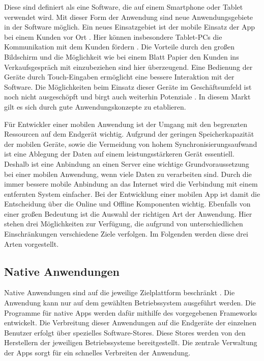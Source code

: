 Diese sind definiert als eine Software, die auf einem Smartphone oder Tablet verwendet wird. Mit dieser Form der Anwendung sind neue Anwendungsgebiete in der Software möglich. Ein neues Einsatzgebiet ist der mobile Einsatz der App bei einem Kunden vor Ort \cite{bib:mobileMarketing}. Hier können insbesondere Tablet-PCs die Kommunikation mit dem Kunden fördern \cite{bib:tableVertrieb}. Die Vorteile durch den großen Bildschirm und die Möglichkeit wie bei einem Blatt Papier den Kunden ins Verkaufsgespräch mit einzubeziehen sind hier überzeugend. Eine Bedienung der Geräte durch Touch-Eingaben ermöglicht eine bessere Interaktion mit der Software. Die Möglichkeiten beim Einsatz dieser Geräte im Geschäftsumfeld ist noch nicht ausgeschöpft und birgt auch weiterhin Potenziale \cite[Fazit]{bib:mobileMarketing2}. In diesem Markt gilt es sich durch gute Anwendungskonzepte zu etablieren. \par

Für Entwickler einer mobilen Anwendung ist der Umgang mit den begrenzten Ressourcen auf dem Endgerät wichtig. 
Aufgrund der geringen Speicherkapazität der mobilen Geräte, sowie die Vermeidung von hohem Synchronisierungsaufwand ist eine Ablegung der Daten auf einem leistungsstärkeren Gerät essentiell. Deshalb ist eine Anbindung an einen Server eine wichtige Grundvoraussetzung bei einer mobilen Anwendung, wenn viele Daten zu verarbeiten sind.  Durch die immer bessere mobile Anbindung an das Internet wird die Verbindung mit einem entfernten System einfacher. Bei der Entwicklung einer mobilen App ist damit die Entscheidung über die Online und Offline Komponenten wichtig.
Ebenfalls von einer großen Bedeutung ist die Auswahl der richtigen Art der Anwendung. Hier stehen drei Möglichkeiten zur Verfügung, die aufgrund von unterschiedlichen Einschränkungen verschiedene Ziele verfolgen. Im Folgenden werden diese drei Arten vorgestellt.

\subsection{Native Anwendungen}
Native Anwendungen sind auf die jeweilige Zielplattform beschränkt \cite{bib:mobilePlattform}. Die Anwendung kann nur auf dem gewählten Betriebssystem ausgeführt werden. Die Programme für native Apps werden dafür mithilfe des vorgegebenen Frameworks entwickelt. Die Verbreitung dieser Anwendungen auf die Endgeräte der einzelnen Benutzer erfolgt über spezielles Software-Stores. Diese Stores werden von den Herstellern der jeweiligen Betriebssysteme bereitgestellt. Die zentrale Verwaltung der Apps sorgt für ein schnelles Verbreiten der Anwendung. \par

